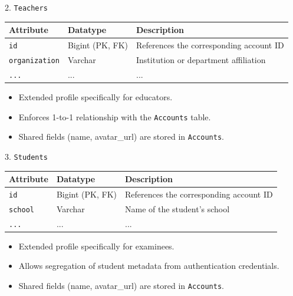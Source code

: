 \documentclass[aspectratio=169, 10pt]{beamer}
\begin{document}
\begin{frame}{2. \texttt{Teachers}}
    \centering
    \small
    \begin{tabular}{|l|l|p{8cm}|}
        \hline
        \textbf{Attribute} & \textbf{Datatype} & \textbf{Description} \\ \hline
        \texttt{id} & Bigint (PK, FK) & References the corresponding account ID\\ \hline
        \texttt{organization} & Varchar & Institution or department affiliation\\ \hline
        \texttt{...} & ... & ...\\ \hline
    \end{tabular}
    \vspace{0.3cm}
    \begin{itemize}
        \item Extended profile specifically for educators.
        \item Enforces 1-to-1 relationship with the \texttt{Accounts} table.
        \item Shared fields (name, avatar\_url) are stored in \texttt{Accounts}.
    \end{itemize}
\end{frame}


\begin{frame}{3. \texttt{Students}}
    \centering
    \small
    \begin{tabular}{|l|l|p{8cm}|}
        \hline
        \textbf{Attribute} & \textbf{Datatype} & \textbf{Description} \\ \hline
        \texttt{id} & Bigint (PK, FK) & References the corresponding account ID\\ \hline
        \texttt{school} & Varchar & Name of the student's school\\ \hline
        \texttt{...} & ... & ...\\ \hline
    \end{tabular}
    \vspace{0.3cm}
    \begin{itemize}
        \item Extended profile specifically for examinees.
        \item Allows segregation of student metadata from authentication credentials.
        \item Shared fields (name, avatar\_url) are stored in \texttt{Accounts}.
    \end{itemize}
\end{frame}
\end{document}
